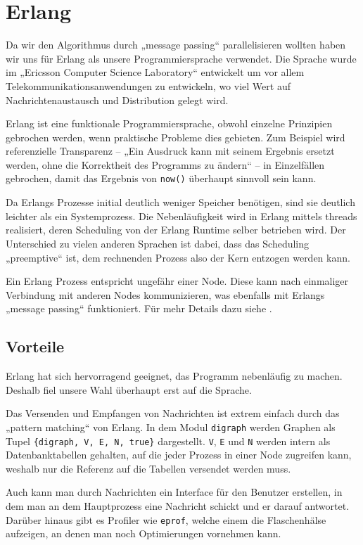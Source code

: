 \chapter{Erlang}
Da wir den Algorithmus durch „message passing“ parallelisieren wollten
haben wir uns für Erlang als unsere Programmiersprache verwendet.  Die
Sprache wurde im „Ericsson Computer Science Laboratory“ entwickelt um
vor allem Telekommunikationsanwendungen zu entwickeln, wo viel Wert
auf Nachrichtenaustausch und Distribution gelegt wird.

Erlang ist eine funktionale Programmiersprache, obwohl einzelne
Prinzipien gebrochen werden, wenn praktische Probleme dies gebieten.
Zum Beispiel wird referenzielle Transparenz – „Ein Ausdruck kann mit
seinem Ergebnis ersetzt werden, ohne die Korrektheit des Programms zu
ändern“ – in Einzelfällen gebrochen, damit das Ergebnis von
\lstinline!now()! überhaupt sinnvoll sein kann.

Da Erlangs Prozesse initial deutlich weniger Speicher benötigen, sind
sie deutlich leichter als ein Systemprozess.  Die Nebenläufigkeit wird
in Erlang mittels threads realisiert, deren Scheduling von der Erlang
Runtime selber betrieben wird.  Der Unterschied zu vielen anderen
Sprachen ist dabei, dass das Scheduling „preemptive“ ist, dem
rechnenden Prozess also der Kern entzogen werden kann.

Ein Erlang Prozess entspricht ungefähr einer Node.  Diese kann nach
einmaliger Verbindung mit anderen Nodes kommunizieren, was ebenfalls
mit Erlangs „message passing“ funktioniert.  Für mehr Details dazu
siehe \cite[Kapitel~„Distribunomicon“]{lyse}.

\section{Vorteile}
Erlang hat sich hervorragend geeignet, das Programm nebenläufig zu
machen.  Deshalb fiel unsere Wahl überhaupt erst auf die Sprache.

Das Versenden und Empfangen von Nachrichten ist extrem einfach durch
das „pattern matching“ von Erlang.  In dem Modul \lstinline!digraph!
werden Graphen als Tupel \lstinline!{digraph, V, E, N, true}!
dargestellt.  \lstinline!V!, \lstinline!E! und \lstinline!N! werden
intern als Datenbanktabellen gehalten, auf die jeder Prozess in einer
Node zugreifen kann, weshalb nur die Referenz auf die Tabellen
versendet werden muss.

Auch kann man durch Nachrichten ein Interface für den Benutzer
erstellen, in dem man an dem Hauptprozess eine Nachricht schickt und
er darauf antwortet.  Darüber hinaus gibt es Profiler wie
\lstinline!eprof!, welche einem die Flaschenhälse aufzeigen, an denen
man noch Optimierungen vornehmen kann.

